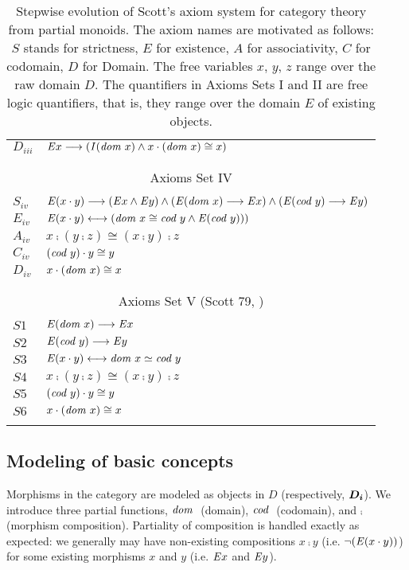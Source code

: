 \begin{table}[htp]
\begin{tabular}{ll}
 $D_{iii}$ & $\mathit{E} x \longrightarrow (\textit{I\/}(\textit{dom \/} x) \wedge x \cdot (\textit{dom \/} x) \cong x)$ \\
\\
\hline
\\
\multicolumn{2}{c}{Axioms Set IV} \\
\\
$S_{iv}$ & $\mathit{E}(x \cdot y) \longrightarrow (\mathit{E} x \wedge \mathit{E} y) \wedge (\mathit{E} (\textit{dom \/} x) \longrightarrow \mathit{E}
        x) \wedge (\mathit{E} (\textit{cod \/} y) \longrightarrow \mathit{E}
        y)$ \\
 $E_{iv}$ & $\mathit{E}(x \cdot y) \longleftrightarrow (\textit{dom \/} x \cong \textit{cod \/} y \wedge \mathit{E} (\textit{cod \/} y)))$ \\
 $A_{iv}$ & $x\comp (y \comp z) \cong (x \comp y) \comp z$ \\
 $C_{iv}$ & $(\textit{cod \/} y) \cdot y \cong y$ \\
 $D_{iv}$ & $x \cdot (\textit{dom \/} x) \cong x$  \\
\\
\hline
\\
\multicolumn{2}{c}{Axioms Set V (Scott 79, \cite{Scott79})} \\
\\
$S1$ & $\mathit{E} (\textit{dom \/} x) \longrightarrow \mathit{E} x$ \\
$S2$ & $\mathit{E} (\textit{cod \/} y) \longrightarrow \mathit{E} y$ \\
$S3$ & $\mathit{E}(x \cdot y) \longleftrightarrow \textit{dom \/} x \simeq \textit{cod \/} y$ \\
$S4$ & $x\comp (y \comp z) \cong (x \comp y) \comp z$ \\
$S5$ & $(\textit{cod \/} y) \cdot y \cong y$ \\
$S6$ & $x \cdot (\textit{dom \/} x) \cong x$  \\
\\
\hline
\end{tabular}
\caption{Stepwise evolution of Scott's \cite{Scott79} axiom
  system for category theory from partial monoids. The axiom names are
  motivated as follows: 
  $S$ stands for strictness, $E$ for existence, $A$ for associativity, $C$ for
  codomain, $D$ for Domain. The free variables $x$, $y$, $z$ range over
  the raw domain $D$. The quantifiers in Axioms Sets I and II are
  free logic quantifiers, that is, they range over the domain $E$ of
  existing objects. \label{axioms-sets-1}}
\end{table}





\subsection{Modeling of basic concepts}
Morphisms in the category are modeled as objects in $D$ (respectively,
$\boldsymbol{D_i}$). We introduce three partial functions, 
$\textit{dom \/}$ (domain), $\textit{cod \/}$ (codomain), and $\comp$ (morphism composition). 
Partiality of composition is handled exactly as expected: we generally may have 
non-existing compositions $x\comp y$ (i.e. $\neg(\mathit{E}(x\cdot y))$) for some existing  
morphisms $x$ and $y$ (i.e. $\mathit{E} x$ and $\mathit{E} y$).

